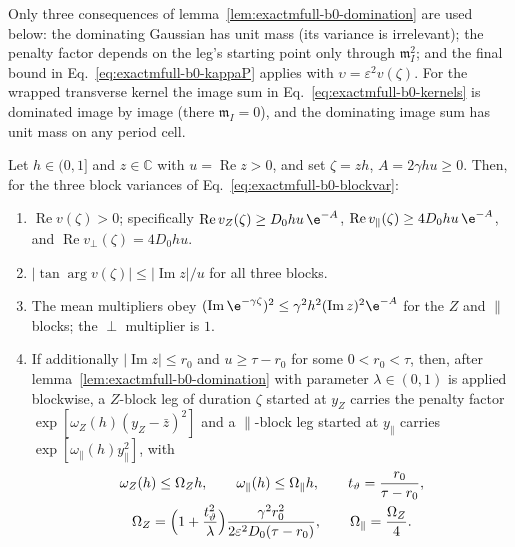 Only three consequences of lemma~\ref{lem:exactmfull-b0-domination} are used
below: the dominating Gaussian has unit mass (its variance is irrelevant);
the penalty factor depends on the leg's starting point only through
\(\mathfrak m_I^2\); and the final bound in
Eq.~\eqref{eq:exactmfull-b0-kappaP} applies with
\(\upsilon=\varepsilon^2v(\zeta)\).  For the wrapped transverse kernel the
image sum in Eq.~\eqref{eq:exactmfull-b0-kernels} is dominated image by
image (there \(\mathfrak m_I=0\)), and the dominating image sum has unit
mass on any period cell.

\begin{lemma}
\label{lem:exactmfull-b0-legs}
Let \(h\in(0,1]\) and \(z\in\mathbb C\) with \(u=\operatorname{Re}z>0\), and
set \(\zeta=zh\), \(A=2\gamma hu\ge0\).  Then, for the three block variances
of Eq.~\eqref{eq:exactmfull-b0-blockvar}:
\begin{enumerate}
\item[(a)] \(\operatorname{Re}v(\zeta)>0\); specifically
\(\operatorname{Re}v_Z(\zeta)\ge D_0hu\,\e^{-A}\),
\(\operatorname{Re}v_\parallel(\zeta)\ge4D_0hu\,\e^{-A}\), and
\(\operatorname{Re}v_\perp(\zeta)=4D_0hu\).
\item[(b)] \(|\tan\arg v(\zeta)|\le|\operatorname{Im}z|/u\) for all three
blocks.
\item[(c)] The mean multipliers obey
\((\operatorname{Im}\e^{-\gamma\zeta})^2
\le\gamma^2h^2(\operatorname{Im}z)^2\e^{-A}\) for the \(Z\) and
\(\parallel\) blocks; the \(\perp\) multiplier is \(1\).
\item[(d)] If additionally \(|\operatorname{Im}z|\le r_0\) and
\(u\ge\tau-r_0\) for some \(0<r_0<\tau\), then, after
lemma~\ref{lem:exactmfull-b0-domination} with parameter
\(\lambda\in(0,1)\) is applied blockwise, a \(Z\)-block leg of duration
\(\zeta\) started at \(y_Z\) carries the penalty factor
\(\exp[\omega_Z(h)(y_Z-\bar z)^2]\) and a \(\parallel\)-block leg started at
\(y_\parallel\) carries \(\exp[\omega_\parallel(h)y_\parallel^2]\), with
\begin{equation}
 \begin{gathered}
 \omega_Z(h)\le\Omega_Zh,
 \qquad
 \omega_\parallel(h)\le\Omega_\parallel h,
 \qquad
 t_\vartheta=\frac{r_0}{\tau-r_0},\\
 \Omega_Z
 =\Bigl(1+\frac{t_\vartheta^2}{\lambda}\Bigr)
  \frac{\gamma^2r_0^2}{2\varepsilon^2D_0(\tau-r_0)},
 \qquad
 \Omega_\parallel=\frac{\Omega_Z}{4}.
 \end{gathered}
 \label{eq:exactmfull-b0-budget}
\end{equation}

\end{enumerate}
\end{lemma}
